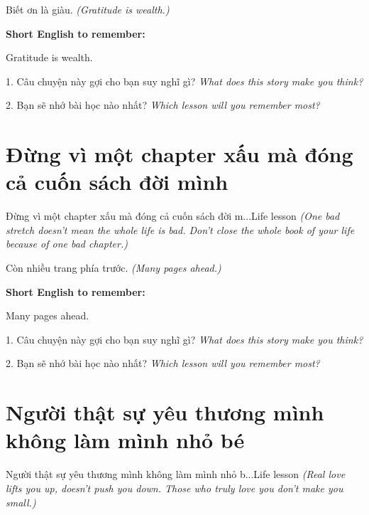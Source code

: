 \begin{baihoc}
Biết ơn là giàu.
\textit{(Gratitude is wealth.)}
\end{baihoc}

\begin{ghinhoanh}
\textbf{Short English to remember:}

Gratitude is wealth.

\end{ghinhoanh}

\begin{tuhocnhanh}
1. Câu chuyện này gợi cho bạn suy nghĩ gì? \textit{What does this story make you think?}

2. Bạn sẽ nhớ bài học nào nhất? \textit{Which lesson will you remember most?}
\end{tuhocnhanh}
\ngancach


\section{Đừng vì một chapter xấu mà đóng cả cuốn sách đời mình}
\begin{truyen}{Đừng vì một chapter xấu mà đóng cả cuốn sách đời m...}{Life lesson}
\textit{(One bad stretch doesn't mean the whole life is bad. Don't close the whole book of your life because of one bad chapter.)}
\end{truyen}

\begin{baihoc}
Còn nhiều trang phía trước.
\textit{(Many pages ahead.)}
\end{baihoc}

\begin{ghinhoanh}
\textbf{Short English to remember:}

Many pages ahead.

\end{ghinhoanh}

\begin{tuhocnhanh}
1. Câu chuyện này gợi cho bạn suy nghĩ gì? \textit{What does this story make you think?}

2. Bạn sẽ nhớ bài học nào nhất? \textit{Which lesson will you remember most?}
\end{tuhocnhanh}
\ngancach


\section{Người thật sự yêu thương mình không làm mình nhỏ bé}
\begin{truyen}{Người thật sự yêu thương mình không làm mình nhỏ b...}{Life lesson}
\textit{(Real love lifts you up, doesn't push you down. Those who truly love you don't make you small.)}
\end{truyen}

